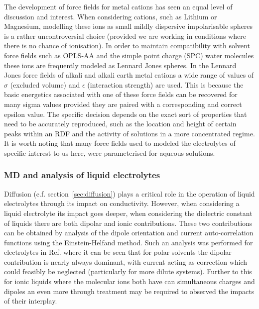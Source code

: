 \documentclass[../main.tex]{subfiles}
\begin{document}
The development of force fields for metal cations has seen an equal level of discussion and interest. When considering cations, such as Lithium or Magnesium\cite{mamatkulov_force_2013,mamatkulov_force_2018}, modelling these ions as small mildly dispersive impolarisable spheres is a rather uncontroversial choice (provided we are working in conditions where there is no chance of ionisation)\cite{schroder_polarizable_2020}. In order to maintain compatibility with solvent force fields such as OPLS-AA and the simple point charge (SPC) water molecules these ions are frequently modeled as Lennard Jones spheres. In the Lennard Jones force fields of alkali and alkali earth metal cations a wide range of values of $\sigma$ (excluded volume) and $\epsilon$ (interaction strength) are used. This is because the basic energetics associated with one of these force fields can be recovered for many sigma values provided they are paired with a corresponding and correct epsilon value. The specific decision depends on the exact sort of properties that need to be accurately reproduced, such as the location and height of certain peaks within an RDF and the activity of solutions in a more concentrated regime\cite{mamatkulov_force_2013}. It is worth noting that many force fields used to modeled the electrolytes of specific interest to us here, were parameterised for aqueous solutions.

\subsubsection{MD and analysis of liquid electrolytes}

Diffusion (c.f. section~\ref{sec:diffusion}) plays a critical role in the operation of liquid electrolytes through its impact on conductivity. However, when considering a liquid electrolyte its impact goes deeper, when considering the dielectric constant of liquids there are both dipolar and ionic contributions. These two contributions can be obtained by analysis of the dipole orientation and current auto-correlation functions using the Einstein-Helfand method. Such an analysis was performed for electrolytes in Ref.  where it can be seen that for polar solvents the dipolar contribution is nearly always dominant, with current acting as correction which could feasibly be neglected (particularly for more dilute systems). Further to this for ionic liquids where the molecular ions both have can simultaneous charges and dipoles an even more through treatment may be required to observed the impacts of their interplay\cite{schroder_dielectric_2009}.
\end{document}
